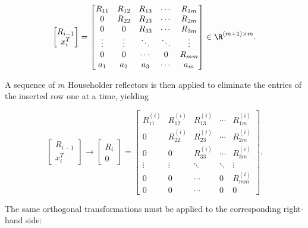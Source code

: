 \begin{equation}
    \begin{bmatrix}
        R_{i-1} \\
        x_i^T
    \end{bmatrix}
    =
    \begin{bmatrix}
        R_{11} & R_{12} & R_{13} & \cdots & R_{1m} \\
        0      & R_{22} & R_{23} & \cdots & R_{2m} \\
        0      & 0      & R_{33} & \cdots & R_{3m} \\
        \vdots & \vdots & \ddots & \ddots & \vdots \\
        0      & 0      & \cdots & 0      & R_{mm} \\
        a_1    & a_2    & a_3    & \cdots & a_m
    \end{bmatrix}
    \in \R^{(m+1)\times m}.
\end{equation}

\noindent A sequence of $m$ Householder reflectors is then applied to eliminate the entries of the inserted row one at a time, yielding

\begin{equation}
    \begin{bmatrix}
        R_{i-1} \\
        x_i^T
    \end{bmatrix}
    \longrightarrow
    \begin{bmatrix}
        R_i \\
        0
    \end{bmatrix}
    =
    \begin{bmatrix}
        R^{(i)}_{11} & R^{(i)}_{12} & R^{(i)}_{13} & \cdots & R^{(i)}_{1m} \\
        0            & R^{(i)}_{22} & R^{(i)}_{23} & \cdots & R^{(i)}_{2m} \\
        0            & 0            & R^{(i)}_{33} & \cdots & R^{(i)}_{3m} \\
        \vdots       & \vdots       & \ddots       & \ddots & \vdots \\
        0            & 0            & \cdots       & 0      & R^{(i)}_{mm} \\
        0            & 0            & \cdots       & 0      & 0
    \end{bmatrix}.
\end{equation}

\noindent The same orthogonal transformations must be applied to the corresponding right-hand side:

